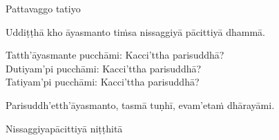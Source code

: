 \begin{center}
  Pattavaggo tatiyo
\end{center}

\medskip

\begin{center}
Uddiṭṭhā kho āyasmanto tiṁsa nissaggiyā pācittiyā dhammā.

\smallskip

Tatth'āyasmante pucchāmi: Kacci'ttha parisuddhā?\\
Dutiyam'pi pucchāmi: Kacci'ttha parisuddhā?\\
Tatiyam'pi pucchāmi: Kacci'ttha parisuddhā?

\smallskip

Parisuddh'etth'āyasmanto, tasmā tuṇhī, evam'etaṁ dhārayāmi.
\end{center}

\begin{outro}
  Nissaggiyapācittiyā niṭṭhitā
\end{outro}

\clearpage
